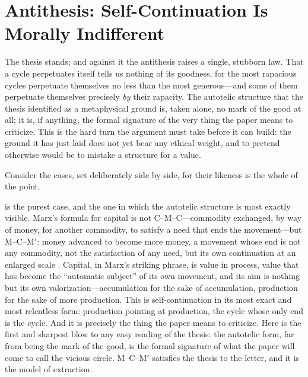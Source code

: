 \section{Antithesis: Self-Continuation Is Morally Indifferent}
\label{p09:sec:antithesis}

\noindent
The thesis stands; and against it the antithesis raises a single, stubborn law.  That a cycle perpetuates itself tells us nothing of its goodness, for the most rapacious cycles perpetuate themselves no less than the most generous---and some of them perpetuate themselves precisely \emph{by} their rapacity. The autotelic structure that the thesis identified as a metaphysical ground is, taken alone, no mark of the good at all; it is, if anything, the formal signature of the very thing the paper means to criticize. This is the hard turn the argument must take before it can build: the ground it has just laid does not yet bear any ethical weight, and to pretend otherwise would be to mistake a structure for a value.

Consider the cases, set deliberately side by side, for their likeness is the whole of the point.

 is the purest case, and the one in which the autotelic structure is most exactly visible. Marx's formula for capital is not C--M--C---commodity exchanged, by way of money, for another commodity, to satisfy a need that ends the movement---but M--C--M$'$: money advanced to become more money, a movement whose end is not any commodity, not the satisfaction of any need, but its own continuation at an enlarged scale \parencite{marx1976}. Capital, in Marx's striking phrase, is value in process, value that has become the ``automatic subject'' of its own movement, and its aim is nothing but its own valorization---accumulation for the sake of accumulation, production for the sake of more production. This is self-continuation in its most exact and most relentless form: production pointing at production, the cycle whose only end is the cycle. And it is precisely the thing the paper means to criticize. Here is the first and sharpest blow to any easy reading of the thesis: the autotelic form, far from being the mark of the good, is the formal signature of what the paper will come to call the vicious circle. M--C--M$'$ satisfies the thesis to the letter, and it is the model of extraction.

